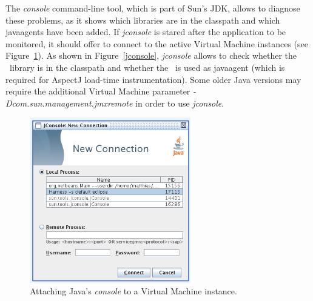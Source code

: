 \documentclass[a4paper,12pt]{scrartcl}
\begin{document}
The \textit{console} command-line tool, which is part of Sun's JDK, allows to diagnose these problems, as it shows which libraries are in the classpath and which javaagents have been added. If \textit{jconsole} is stared after the application to be monitored, it should offer to connect to the active Virtual Machine instances (see Figure~\ref{jconsolestartup}). As shown in Figure~\ref{jconsole}, \textit{jconsole} allows to check whether the \tpmon\ library is in the classpath and whether the \aspectjweaverjar\ is used as javaagent (which is required for AspectJ load-time instrumentation). Some older Java versions may require the additional Virtual Machine parameter \textit{-Dcom.sun.management.jmxremote} in order to use \textit{jconsole}.

\begin{figure}
 \centering
 \includegraphics[width=7cm]{snapshot4b.png}
\caption{Attaching Java's \textit{console} to a Virtual Machine instance.}
 \label{jconsolestartup}
\end{figure}
\end{document}
